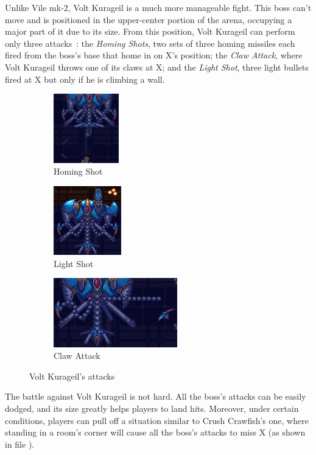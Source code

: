 Unlike Vile mk-2, Volt Kurageil is a much more manageable fight. This boss can't move and is positioned in the upper-center portion of the arena, occupying a major part of it due to its size. From this position, Volt Kurageil can perform only three attacks~\cite{book:Compendium}: the \emph{Homing Shots}, two sets of three homing missiles each fired from the boss's base that home in on X's position; the \emph{Claw Attack}, where Volt Kurageil throws one of its claws at X; and the \emph{Light Shot}, three light bullets fired at X but only if he is climbing a wall.
\begin{figure}[htp]
	\centering
	\begin{subfigure}{.25\linewidth}
		\centering
		\includegraphics[height=3cm]{figures/X3/Doppler_stages/kurageil_missile.jpg}
		\caption{Homing Shot}
	\end{subfigure}
	\begin{subfigure}{.25\linewidth}
		\centering
		\includegraphics[height=3cm]{figures/X3/Doppler_stages/kurageil_plasma.jpg}
		\caption{Light Shot}
	\end{subfigure}
	\begin{subfigure}{\linewidth}
		\centering
		\includegraphics[height=3cm]{figures/X3/Doppler_stages/kurageil_claw.jpg}
		\caption{Claw Attack}
	\end{subfigure}
	\caption{Volt Kurageil's attacks}
\end{figure}
The battle against Volt Kurageil is not hard. All the boss's attacks can be easily dodged, and its size greatly helps players to land hits. Moreover, under certain conditions, players can pull off a situation similar to Crush Crawfish's one, where standing in a room's corner will cause all the boss's attacks to miss X (as shown in file ).

